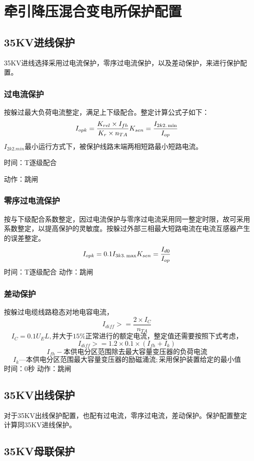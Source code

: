 \chapter{牵引降压混合变电所保护配置}

\section{35KV进线保护}
35KV进线选择采用过电流保护，零序过电流保护，以及差动保护，来进行保护配置。
\subsection{过电流保护}
按躲过最大负荷电流整定，满足上下级配合。整定计算公式子如下：
$$
I_{opk}=\frac{K_{rel}\times I_{fh}}{K_r\times n_{TA}}
\\
K_{sen}=\frac{I_{2k2.\min}}{I_{op}}
$$
$I_{2k2.min}$最小运行方式下，被保护线路末端两相短路最小短路电流。\par 
时间：T逐级配合\par 
动作：跳闸
\subsection{零序过电流保护}
按与下级配合系数整定，因过电流保护与零序过电流采用同一整定时限，故可采用系数整定，以提高保护的灵敏度。按躲过外部三相最大短路电流在电流互感器产生的误差整定。
$$
I_{opk}=0.1I_{3k3.\max}
\\
K_{sen}=\frac{I_{d0}}{I_{op}}
$$
时间：T逐级配合\newline 
动作：跳闸
\subsection{差动保护}
按躲过电缆线路稳态对地电容电流，
$$
I_{diff}>=\frac{2\times I_C}{n_{TA}}
$$
$$
I_C=0.1U_EL,\text{并大于}15\%\text{正常进行的额定电流，整定值还需要按照下式考虑，}
$$
$$
I_{diff}>=1.2\times 0.1\times \left( I_{fh}+I_k \right) 
$$
$$
I_{fh}-\text{本供电分区范围除去最大容量变压器的负荷电流}
$$
$$
I_k—\text{本供电分区范围最大容量变压器的励磁涌流};\text{采用保护装置给定的最小值}
$$
时间：0秒\newline
动作：跳闸
\section{35KV出线保护}
对于35KV出线保护配置，也配有过电流，零序过电流，差动保护。保护配置整定计算同35KV进线保护。
\section{35KV母联保护}
